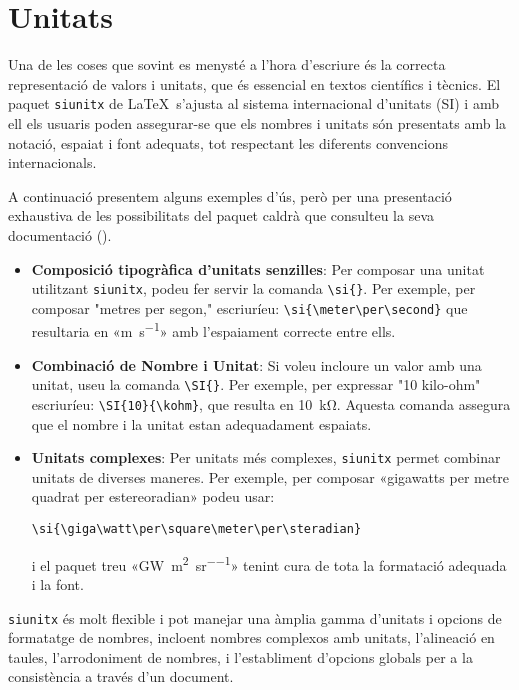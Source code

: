 \ifcase\doclanguage\or
  \section{Unitats}
  
  Una de les coses que sovint es menysté a l'hora d'escriure és la correcta representació de valors i unitats, que és essencial en textos científics i tècnics. El paquet \texttt{siunitx} de \LaTeX\ s'ajusta al sistema internacional d'unitats (SI) i amb ell els usuaris poden assegurar-se que els nombres i unitats són presentats amb la notació, espaiat i font adequats, tot respectant les diferents convencions internacionals.
  
  A continuació presentem alguns exemples d'ús, però per una presentació exhaustiva de les possibilitats del paquet caldrà que consulteu la seva documentació (\cite{siunitx}).
  
  \begin{itemize}
    \item \textbf{Composició tipogràfica d'unitats senzilles}: Per composar una unitat utilitzant \texttt{siunitx}, podeu fer servir la comanda \verb|\si{}|. Per exemple, per composar "metres per segon," escriuríeu:
       \verb|\si{\meter\per\second}| que resultaria en «\si{\meter\per\second}» amb l'espaiament correcte entre ells.
    
    \item \textbf{Combinació de Nombre i Unitat}: Si voleu incloure un valor amb una unitat, useu la comanda \verb|\SI{}|. Per exemple, per expressar "10 kilo-ohm" escriuríeu:
       \verb|\SI{10}{\kohm}|, que resulta en \SI{10}{\kohm}. Aquesta comanda assegura que el nombre i la unitat estan adequadament espaiats.
    
    \item \textbf{Unitats complexes}: Per unitats més complexes, \texttt{siunitx} permet combinar unitats de diverses maneres. Per exemple, per composar «gigawatts per metre quadrat per estereoradian» podeu usar:
    
    \verb|\si{\giga\watt\per\square\meter\per\steradian}|
    
    i el paquet treu «\si{\giga\watt\per\square\meter\per\steradian}» tenint cura de tota la formatació adequada i la font.
  \end{itemize}

  \texttt{siunitx} és molt flexible i pot manejar una àmplia gamma d'unitats i opcions de formatatge de nombres, incloent nombres complexos amb unitats, l'alineació en taules, l'arrodoniment de nombres, i l'establiment d'opcions globals per a la consistència a través d'un document.
\or
